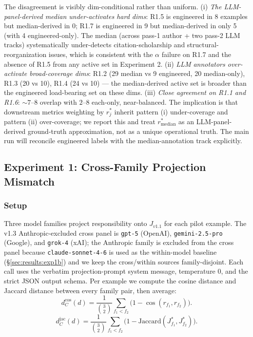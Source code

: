 The disagreement is visibly dim-conditional rather than uniform. (i) \emph{The LLM-panel-derived median under-activates hard dims}: R1.5 is engineered in 8 examples but median-derived in 0; R1.7 is engineered in 9 but median-derived in only 5 (with 4 engineered-only). The median (across pass-1 author + two pass-2 LLM tracks) systematically under-detects citation-scholarship and structural-reorganization issues, which is consistent with the $\alpha$ failure on R1.7 and the absence of R1.5 from any active set in Experiment 2. (ii) \emph{LLM annotators over-activate broad-coverage dims}: R1.2 (29 median vs 9 engineered, 20 median-only), R1.3 (20 vs 10), R1.4 (24 vs 10) --- the median-derived active set is broader than the engineered load-bearing set on these dims. (iii) \emph{Close agreement on R1.1 and R1.6}: $\sim 7$--$8$ overlap with $2$--$8$ each-only, near-balanced. The implication is that downstream metrics weighting by $r^*_j$ inherit pattern (i) under-coverage and pattern (ii) over-coverage; we report this and treat $r^*_{\text{median}}$ as an LLM-panel-derived ground-truth approximation, not as a unique operational truth. The main run will reconcile engineered labels with the median-annotation track explicitly.


\subsection{Experiment 1: Cross-Family Projection Mismatch}
\label{sec:results:exp1}

\subsubsection{Setup}
Three model families project responsibility onto $J_{v1.1}$ for each pilot example. The v1.3 Anthropic-excluded cross panel is \texttt{gpt-5} (OpenAI), \texttt{gemini-2.5-pro} (Google), and \texttt{grok-4} (xAI); the Anthropic family is excluded from the cross panel because \texttt{claude-sonnet-4-6} is used as the within-model baseline (\S\ref{sec:results:exp1b}) and we keep the cross/within sources family-disjoint. Each call uses the verbatim projection-prompt system message, temperature 0, and the strict JSON output schema. Per example we compute the cosine distance and Jaccard distance between every family pair, then average:
\begin{equation}
d_C^{\cos}(d) = \frac{1}{\binom{3}{2}} \sum_{f_1 < f_2} \bigl( 1 - \cos(r_{f_1}, r_{f_2}) \bigr).
\label{eq:dc_cos}
\end{equation}
\begin{equation}
d_C^{\text{jac}}(d) = \frac{1}{\binom{3}{2}} \sum_{f_1 < f_2} \bigl( 1 - \mathrm{Jaccard}(J^*_{f_1}, J^*_{f_2}) \bigr).
\label{eq:dc_jac}
\end{equation}

